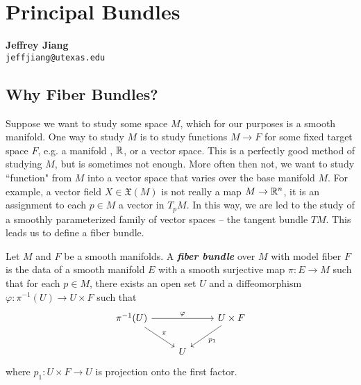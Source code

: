 \documentclass[abstract=on,twoside]{scrreprt}
\begin{document}
\chapter{Principal Bundles} %
\thispagestyle{empty}
\vspace{-2cm}
\begin{flushright}
	\textbf{Jeffrey Jiang}\\ %
	\texttt{jeffjiang@utexas.edu} %
\end{flushright}

\section*{Why Fiber Bundles?}

Suppose we want to study some space $M$, which for our purposes is a smooth manifold.
One way to study $M$ is to study functions $M \to F$ for some fixed target space $F$,
e.g. a manifold , $\mathbb{R}$, or a vector space. This is a perfectly good method
of studying $M$, but is sometimes not enough. More often then not, we want to
study ``function" from $M$ into a vector space that varies over the base
manifold $M$. For example, a vector field $X \in \mathfrak{X}(M)$ is not really
a map $M \to \mathbb{R}^n$, it is an assignment to each $p \in M$ a vector in $T_pM$.
In this way, we are led to the study of a smoothly parameterized family of
vector spaces -- the tangent bundle $TM$. This leads us to define a fiber bundle.
%
\begin{definition}
Let $M$ and $F$ be a smooth manifolds. A \textbf{\textit{fiber bundle}} over $M$ with
model fiber $F$ is the data of a smooth manifold $E$ with a smooth surjective map
$\pi : E \to M$ such that for each $p \in M$, there exists an open set $U$ and a
diffeomorphism $\varphi : \pi^{-1}(U) \to U \times F$ such that
\[\begin{tikzcd}
\pi^{-1}(U) \ar[dr, "\pi"]\ar[rr, "\varphi"] && U \times F \ar[dl, "p_1"] \\
& U
\end{tikzcd}\]
where $p_1 : U \times F \to U$ is projection onto the first factor.
\end{definition}
%
\end{document}
